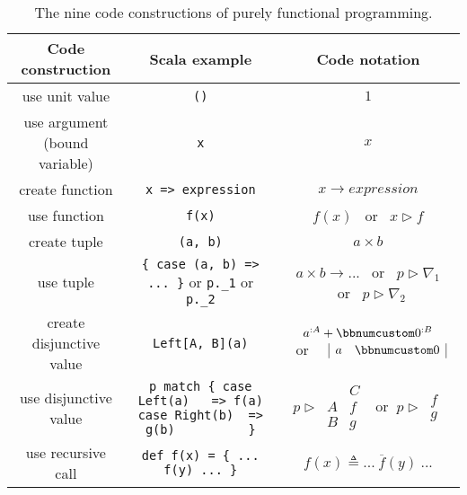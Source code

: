 \begin{table}
\begin{centering}
\begin{tabular}{|c|c|c|}
\hline 
\textbf{\small{}Code construction} & \textbf{\small{}Scala example} & \textbf{\small{}Code notation}\tabularnewline
\hline 
\hline 
{\small{}use unit value} & {\small{}}\lstinline!()! & {\small{}$1$}\tabularnewline
\hline 
{\small{}use argument (bound variable)} & {\small{}}\lstinline!x! & {\small{}$x$}\tabularnewline
\hline 
{\small{}create function} & {\small{}}\lstinline!x => expression! & {\small{}$x\rightarrow expression$}\tabularnewline
\hline 
{\small{}use function} & {\small{}}\lstinline!f(x)! & $f(x)$ ~or~ $x\triangleright f$\tabularnewline
\hline 
{\small{}create tuple} & {\small{}}\lstinline!(a, b)! & {\small{}$a\times b$}\tabularnewline
\hline 
{\small{}use tuple} & {\small{}}\lstinline!{ case (a, b) => ... }!{\small{} or }\lstinline!p._1!{\small{}
or }\lstinline!p._2!{\small{} } & {\small{}$a\times b\rightarrow...$ ~or~ $p\triangleright\nabla_{1}$
~or~ $p\triangleright\nabla_{2}$}\tabularnewline
\hline 
{\small{}create disjunctive value} & {\small{}}\lstinline!Left[A, B](a)! & {\small{}}%
\begin{minipage}[c]{0.19\columnwidth}%
{\small{}\vspace{0.2\baselineskip}
$a^{:A}+\bbnum 0^{:B}$ ~or~~ $\begin{array}{|cc|}
a & \bbnum 0\end{array}$\vspace{0.2\baselineskip}
}%
\end{minipage}\tabularnewline
\hline 
{\small{}use disjunctive value} & {\small{}}%
\begin{minipage}[c]{0.33\columnwidth}%
{\small{}}\lstinline!p match { case Left(a)   => f(a)            case Right(b)  => g(b)          }!%
\end{minipage} & {\small{}}%
\begin{minipage}[c]{0.23\columnwidth}%
{\small{}\vspace{0.2\baselineskip}
$p\triangleright\,\begin{array}{|c||c|}
 & C\\
\hline A & f\\
B & g
\end{array}\,~\text{ or }~p\triangleright\,\begin{array}{||c|}
f\\
g
\end{array}$\vspace{0.2\baselineskip}
}%
\end{minipage}\tabularnewline
\hline 
{\small{}use recursive call} & {\small{}}\lstinline!def f(x) = { ... f(y) ... }! & {\small{}$f(x)\triangleq...~\overline{f}(y)~...$}\tabularnewline
\hline 
\end{tabular}
\par\end{centering}
\caption{The nine code constructions
of purely functional programming.\label{tab:nine-pure-code-constructions}}
\end{table}


